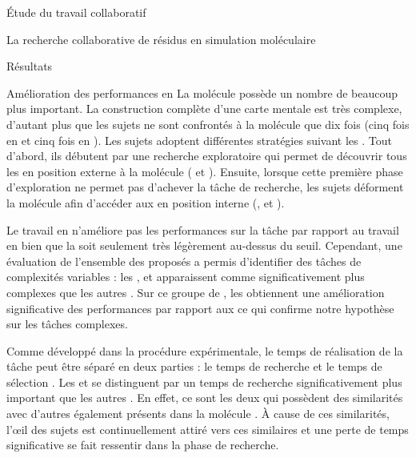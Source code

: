 \documentclass[myfrancais]{mythesis}
\begin{document}
\begin{mypart}{Étude du travail collaboratif}
\begin{mychapter}{La recherche collaborative de résidus en simulation moléculaire}
\begin{mysection}{Résultats}
\begin{mysubsection}{Amélioration des performances en }
					La molécule \myPrion possède un nombre de  beaucoup plus important.
					La construction complète d'une carte mentale est très complexe, d'autant plus que les sujets ne sont confrontés à la molécule que dix fois (cinq fois en  et cinq fois en ).
					Les sujets adoptent différentes stratégies suivant les .
					Tout d'abord, ils débutent par une recherche exploratoire qui permet de découvrir tous les   en position externe à la molécule ( et ).
					Ensuite, lorsque cette première phase d'exploration ne permet pas d'achever la tâche de recherche, les sujets déforment la molécule afin d'accéder aux  en position interne (,  et ).

					Le travail en  n'améliore pas les performances sur la tâche par rapport au travail en  bien que la \mypvalue soit seulement très légèrement au-dessus du seuil.
					Cependant, une évaluation de l'ensemble des  proposés a permis d'identifier des tâches de complexités variables : les  ,  et  apparaissent comme significativement plus complexes que les autres .
					Sur ce groupe de , les  obtiennent une amélioration significative des performances par rapport aux  ce qui confirme notre hypothèse  sur les tâches complexes.

					Comme développé dans la procédure expérimentale, le temps de réalisation de la tâche peut être séparé en deux parties : le temps de recherche et le temps de sélection .
					Les   et  se distinguent par un temps de recherche significativement plus important que les autres .
					En effet, ce sont les deux  qui possèdent des similarités avec d'autres  également présents dans la molécule .
					À cause de ces similarités, l'œil des sujets est continuellement attiré vers ces  similaires et une perte de temps significative se fait ressentir dans la phase de recherche.


\end{mysubsection}
\end{mysection}
\end{mychapter}
\end{mypart}
\end{document}
